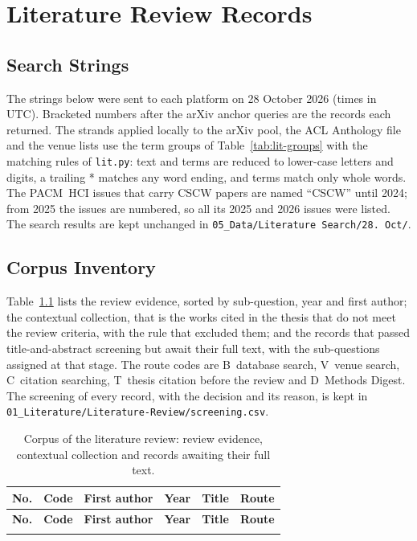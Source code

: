 \chapter{Literature Review Records}
\label{app:literature}

\section{Search Strings}
\label{app:lit-strings}
The strings below were sent to each platform on 28 October 2026 (times in
UTC). Bracketed numbers after the arXiv anchor queries are the records each
returned. The strands applied locally to the arXiv pool, the ACL Anthology file
and the venue lists use the term groups of Table~\ref{tab:lit-groups} with the
matching rules of \texttt{lit.py}: text and terms are reduced to lower-case
letters and digits, a trailing * matches any word ending, and terms match only
whole words. The PACM~HCI issues that carry CSCW papers are named
\enquote{CSCW} until 2024; from 2025 the issues are numbered, so all its 2025
and 2026 issues were listed. The search results are kept unchanged in
\texttt{05\_Data/Literature Search/28. Oct/}.

{\small

}

\section{Corpus Inventory}
\label{app:lit-inventory}
Table~\ref{tab:lit-included} lists the review evidence, sorted by sub-question,
year and first author; the contextual collection, that is the works cited in
the thesis that do not meet the review criteria, with the rule that excluded
them; and the records that passed title-and-abstract screening but await their
full text, with the sub-questions assigned at that stage. The route codes are
B~database search, V~venue search, C~citation searching, T~thesis citation
before the review and D~Methods Digest. The screening of every
record, with the decision and its reason, is kept in
\texttt{01\_Literature/Literature-Review/screening.csv}.

{\footnotesize
\setlength{\tabcolsep}{3.5pt}
\begin{longtable}{@{}r l >{\raggedright\arraybackslash}p{2.2cm} r >{\raggedright\arraybackslash}p{5.9cm} l@{}}
\caption{Corpus of the literature review: review evidence, contextual collection and records awaiting their full text.}\label{tab:lit-included}\\
\toprule
\textbf{No.} & \textbf{Code} & \textbf{First author} & \textbf{Year} & \textbf{Title} & \textbf{Route} \\
\midrule
\endfirsthead
\toprule
\textbf{No.} & \textbf{Code} & \textbf{First author} & \textbf{Year} & \textbf{Title} & \textbf{Route} \\
\midrule
\endhead
\bottomrule
\endfoot
\multicolumn{6}{@{}l}{\textbf{Review evidence (full text assessed)}} \\

\end{longtable}
}
